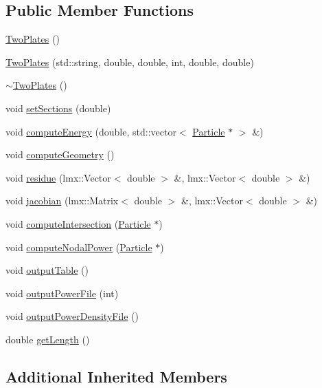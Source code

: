 \subsection*{Public Member Functions}
\begin{DoxyCompactItemize}
\item 
\hyperlink{classTwoPlates_a66e45a6d02f3b6026f8dd99ff5d4653e}{Two\-Plates} ()
\item 
\hyperlink{classTwoPlates_ac1dfa39d5a74aad3e53b12c4bbdcff4e}{Two\-Plates} (std\-::string, double, double, int, double, double)
\item 
\hyperlink{classTwoPlates_af74b10840a05812ceb5aa94ceb7a76f6}{$\sim$\-Two\-Plates} ()
\item 
void \hyperlink{classTwoPlates_a23168c87f9097b2c1a4fa8cac4b61049}{set\-Sections} (double)
\item 
void \hyperlink{classTwoPlates_a68c5911a0b3c24f59c3df0335f1e6c94}{compute\-Energy} (double, std\-::vector$<$ \hyperlink{classParticle}{Particle} $\ast$ $>$ \&)
\item 
void \hyperlink{classTwoPlates_a890d6b6ec49ff021d5d34bf1c2a83099}{compute\-Geometry} ()
\item 
void \hyperlink{classTwoPlates_a71bf9bd3453782adb97e94addabe23ec}{residue} (lmx\-::\-Vector$<$ double $>$ \&, lmx\-::\-Vector$<$ double $>$ \&)
\item 
void \hyperlink{classTwoPlates_ad1ae0ed441b0ec1f7650501f648ebfdb}{jacobian} (lmx\-::\-Matrix$<$ double $>$ \&, lmx\-::\-Vector$<$ double $>$ \&)
\item 
void \hyperlink{classTwoPlates_ac0d504d8b9d2cad3b6facd0cb260d7de}{compute\-Intersection} (\hyperlink{classParticle}{Particle} $\ast$)
\item 
void \hyperlink{classTwoPlates_a30eb56de2071f12cb1405057dda35329}{compute\-Nodal\-Power} (\hyperlink{classParticle}{Particle} $\ast$)
\item 
void \hyperlink{classTwoPlates_a8688d978fd1845b370d3fc14d8737e9e}{output\-Table} ()
\item 
void \hyperlink{classTwoPlates_a978c078774fe74e99b8f4064a6126e84}{output\-Power\-File} (int)
\item 
void \hyperlink{classTwoPlates_aec5195987f06df32b1bd1c4c3c0068f9}{output\-Power\-Density\-File} ()
\item 
double \hyperlink{classTwoPlates_a6bff308b65ed2bfe33098ae210626b30}{get\-Length} ()
\end{DoxyCompactItemize}
\subsection*{Additional Inherited Members}


